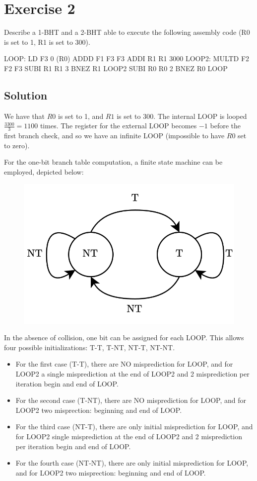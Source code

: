 \section{Exercise 2}

Describe a 1-BHT and a 2-BHT able to execute the following assembly code (R0 is set to 1, R1 is set to 300). 
\begin{verbnobox}[\verbarg]
LOOP:   LD F3 0 (R0)
        ADDD F1 F3 F3
        ADDI R1 R1 3000
LOOP2:  MULTD F2 F2 F3
        SUBI R1 R1 3
        BNEZ R1 LOOP2
        SUBI R0 R0 2
        BNEZ R0 LOOP
\end{verbnobox}

\subsection*{Solution}
We have that $R0$ is set to 1, and $R1$ is set to 300. 
The internal LOOP is looped $\frac{3300}{3}=1100$ times. 
The register for the external LOOP becomes $-1$ before the first branch check, and so we have an infinite LOOP (impossible to have $R0$ set to zero).

For the one-bit branch table computation, a finite state machine can be employed, depicted below:
\begin{figure}[H]
    \centering
    \includegraphics[width=0.4\linewidth]{images/1bht.png}
\end{figure}

In the absence of collision, one bit can be assigned for each LOOP. 
This allows four possible initializations: T-T, T-NT, NT-T, NT-NT.
\begin{itemize}
    \item For the first case (T-T), there are NO misprediction for LOOP, and for LOOP2 a single misprediction at the end of LOOP2 and 2 misprediction per iteration begin and end of LOOP.
    \item For the second case (T-NT), there are NO misprediction for LOOP, and for LOOP2 two misprection: beginning and end of LOOP.
    \item For the third case (NT-T), there are only initial misprediction for LOOP, and for LOOP2 single misprediction at the end of LOOP2 and 2 misprediction per iteration begin and end of LOOP.
    \item For the fourth case (NT-NT), there are only initial misprediction for LOOP, and for LOOP2 two misprection: beginning and end of LOOP. 
\end{itemize}

